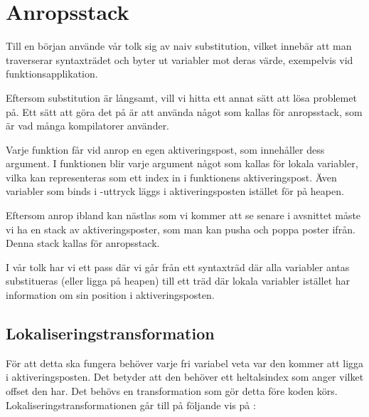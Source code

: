 \documentclass[../Core]{subfiles}
\begin{document}
\section{Anropsstack}
\label{sec:CallStack}

Till en början använde vår tolk sig av naiv substitution, vilket innebär att man
traverserar syntaxträdet och byter ut variabler mot deras värde, exempelvis vid
funktionsapplikation.

Eftersom substitution är långsamt, vill vi hitta ett annat sätt att lösa problemet
på. Ett sätt att göra det på är att använda något som kallas för anropsstack, som
är vad många kompilatorer använder. %

Varje funktion får vid anrop en egen aktiveringspost, som innehåller dess argument.
I funktionen blir varje argument något som kallas för lokala variabler, vilka kan representeras
som ett index in i funktionens aktiveringspost. Även variabler som binds i
-uttryck läggs i aktiveringsposten istället för på heapen. 
  
Eftersom anrop ibland kan nästlas som vi kommer att se senare i avsnittet
måste vi ha en stack av aktiveringsposter, som man kan pusha och poppa poster ifrån.
Denna stack kallas för anropsstack.

I vår tolk har vi ett pass där vi går från ett syntaxträd där alla variabler
antas substitueras (eller ligga på heapen) till ett träd där lokala variabler
istället har information om sin position i aktiveringsposten.




\subsection{Lokaliseringstransformation}

För att detta ska fungera behöver varje fri variabel veta var den kommer att
ligga i aktiveringsposten. Det betyder att den behöver ett heltalsindex som anger
vilket offset den har. Det behövs en transformation som gör detta före koden 
körs. Lokaliseringstransformationen går till på följande vis på : 
\end{document}

